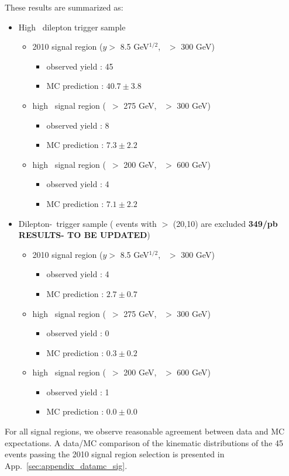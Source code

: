 \clearpage

These results are summarized as:

\begin{itemize}
\item High \pt\ dilepton trigger sample
\begin{itemize}
\item 2010 signal region ($y >$ 8.5 GeV$^{1/2}$, \Ht\ $>$ 300 GeV)
   \begin{itemize} 
   \item observed yield : 45 
   \item MC prediction  : $40.7 \pm 3.8$
   \end{itemize}  
\item high \met\ signal region (\met\ $>$ 275 GeV, \Ht\ $>$ 300 GeV)
   \begin{itemize} 
   \item observed yield : 8 
   \item MC prediction  : $7.3 \pm 2.2$
   \end{itemize}  
\item high \Ht\ signal region (\met\ $>$ 200 GeV, \Ht\ $>$ 600 GeV)
   \begin{itemize} 
   \item observed yield : 4 
   \item MC prediction  : $7.1 \pm 2.2$
   \end{itemize}  
\end{itemize}

\item Dilepton-\Ht\ trigger sample ( events with \pt $>$ (20,10) are excluded {\bf 349/pb RESULTS- TO BE UPDATED})
\begin{itemize}
\item 2010 signal region ($y >$ 8.5 GeV$^{1/2}$, \Ht\ $>$ 300 GeV)
   \begin{itemize} 
   \item observed yield : 4
   \item MC prediction  : $2.7 \pm 0.7$
   \end{itemize}  
\item high \met\ signal region (\met\ $>$ 275 GeV, \Ht\ $>$ 300 GeV)
   \begin{itemize} 
   \item observed yield : 0 
   \item MC prediction  : $0.3 \pm 0.2$
   \end{itemize}  
\item high \Ht\ signal region (\met\ $>$ 200 GeV, \Ht\ $>$ 600 GeV)
   \begin{itemize} 
   \item observed yield : 1 
   \item MC prediction  : $0.0 \pm 0.0$
   \end{itemize}  
\end{itemize}
\end{itemize}

For all signal regions, we observe reasonable agreement between data and MC expectations. 
A data/MC comparison of the kinematic distributions of the 45 events passing
the 2010 signal region selection is presented in App.~\ref{sec:appendix_datamc_sig}.

